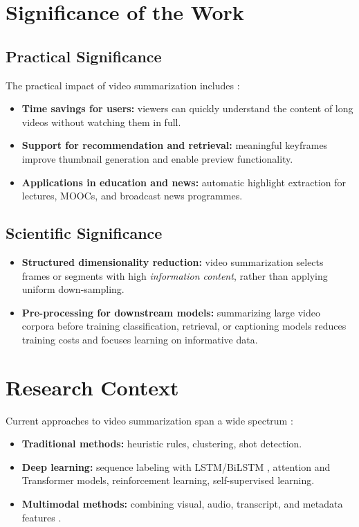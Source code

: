 \documentclass[12pt, a4paper]{report}
\begin{document}
\section{Significance of the Work}

\subsection{Practical Significance}
The practical impact of video summarization includes \cite{kadam2022}:
\begin{itemize}[leftmargin=1.5cm]
  \item \textbf{Time savings for users:} viewers can quickly understand the content
        of long videos without watching them in full.
  \item \textbf{Support for recommendation and retrieval:} meaningful keyframes improve
        thumbnail generation and enable preview functionality.
  \item \textbf{Applications in education and news:} automatic highlight extraction
        for lectures, MOOCs, and broadcast news programmes.
\end{itemize}

\subsection{Scientific Significance}
\begin{itemize}[leftmargin=1.5cm]
  \item \textbf{Structured dimensionality reduction:} video summarization selects
        frames or segments with high \emph{information content}, rather than applying
        uniform down-sampling.
  \item \textbf{Pre-processing for downstream models:} summarizing large video corpora
        before training classification, retrieval, or captioning models reduces
        training costs and focuses learning on informative data.
\end{itemize}

\section{Research Context}

Current approaches to video summarization span a wide spectrum \cite{apostolidis2021}:
\begin{itemize}[leftmargin=1.5cm]
  \item \textbf{Traditional methods:} heuristic rules, clustering, shot detection.
  \item \textbf{Deep learning:} sequence labeling with LSTM/BiLSTM \cite{zhang2016},
        attention and Transformer models, reinforcement learning, self-supervised learning.
  \item \textbf{Multimodal methods:} combining visual, audio, transcript, and metadata
        features \cite{psallidas2021,hu2023}.
\end{itemize}
\end{document}
